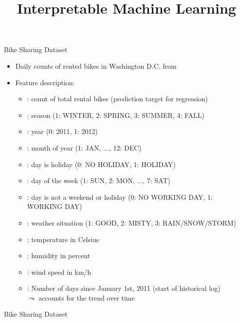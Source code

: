 \documentclass[11pt,compress,t,notes=noshow, aspectratio=169, xcolor=table]{beamer}
\title{Interpretable Machine Learning}
\date{}
\begin{document}
\newcommand{\titlefigure}{figure/open_blackbox}
\newcommand{\learninggoals}{
\item Introduce bike sharing data
\item Description of features
\item EDA of features}


\begin{frame}[t]{Bike Sharing Dataset}
\begin{itemize}
\item Daily counts of rented bikes in Washington D.C. from 
\item Feature description:
\begin{itemize}
\item {}: count of total rental bikes (prediction target for regression)
\item {}: season (1: WINTER, 2: SPRING, 3: SUMMER, 4: FALL)
\item {}: year (0: 2011, 1: 2012)
\item {}: month of year (1: JAN, ..., 12: DEC)
\item {}: day is holiday (0: NO HOLIDAY, 1: HOLIDAY)
\item {}: day of the week (1: SUN, 2: MON, ..., 7: SAT)
\item {}: day is not a weekend or holiday (0: NO WORKING DAY, 1: WORKING DAY)
\item {}: weather situation (1: GOOD, 2: MISTY, 3: RAIN/SNOW/STORM)
\item {}: temperature in Celsius
\item {}: humidity in percent
\item {}: wind speed in km/h
\item {}: Number of days since January 1st, 2011 (start of historical log)\\
$\leadsto$ accounts for the trend over time
\end{itemize}
\end{itemize}
\end{frame}


\begin{frame}[t]{Bike Sharing Dataset}

\end{frame}

\endlecture
\end{document}
